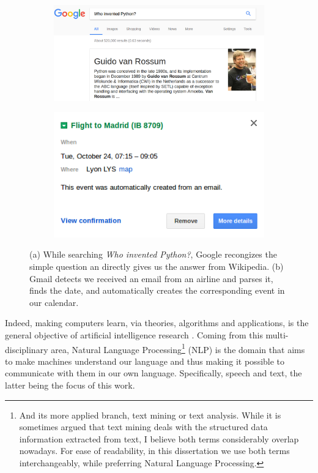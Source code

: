 \begin{figure}[t]
\centering
	\begin{subfigure}[b]{0.55\textwidth}
	\includegraphics[width=1\linewidth]{./images/Chapitre1/guido_google.png}
	\caption{}
\end{subfigure}

	\begin{subfigure}[b]{0.55\textwidth}
	\includegraphics[width=1\linewidth]{./images/Chapitre1/calendar2.png}
	\caption{}
\end{subfigure}
\caption[foo]{(a) While searching \textit{Who invented Python?}, Google recongizes the simple question an directly gives us the answer from Wikipedia. (b) Gmail detects we received an email from an airline and parses it, finds the date, and automatically creates the corresponding event in our calendar.}	
\label{fig:google_nlp}
\end{figure}
%
Indeed, making computers learn,  via theories, algorithms and applications, is the general objective of artificial intelligence research \cite{Sugiyama2015}. Coming from this multi-disciplinary area, Natural Language Processing\footnote{And its more applied branch, text mining or text analysis. While it is sometimes argued that text mining deals with the structured data information extracted from text, I believe both terms considerably overlap nowadays. For ease of readability, in this dissertation we use both terms interchangeably, while preferring Natural Language Processing.} (NLP) is the domain that aims to make machines understand our language \cite{JurafskyM09} and thus making it possible to communicate with them in our own language. Specifically, speech and text, the latter being the focus of this work.

